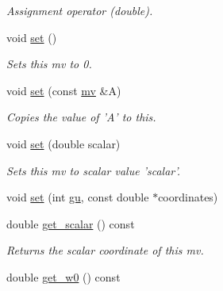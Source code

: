 \begin{DoxyCompactItemize}
\begin{DoxyCompactList}\small\item\em Assignment operator (double). \end{DoxyCompactList}\item 
\hypertarget{classe3ga_1_1mv_a9be643c5b7756c745b6edd8176e7c8e8}{void \hyperlink{classe3ga_1_1mv_a9be643c5b7756c745b6edd8176e7c8e8}{set} ()}\label{classe3ga_1_1mv_a9be643c5b7756c745b6edd8176e7c8e8}

\begin{DoxyCompactList}\small\item\em Sets this mv to 0. \end{DoxyCompactList}\item 
\hypertarget{classe3ga_1_1mv_ab75cf6f261ecdaa82b5be824da877428}{void \hyperlink{classe3ga_1_1mv_ab75cf6f261ecdaa82b5be824da877428}{set} (const \hyperlink{classe3ga_1_1mv}{mv} \&A)}\label{classe3ga_1_1mv_ab75cf6f261ecdaa82b5be824da877428}

\begin{DoxyCompactList}\small\item\em Copies the value of 'A' to this. \end{DoxyCompactList}\item 
\hypertarget{classe3ga_1_1mv_acecd456305cc571c8df569d70ee54332}{void \hyperlink{classe3ga_1_1mv_acecd456305cc571c8df569d70ee54332}{set} (double scalar)}\label{classe3ga_1_1mv_acecd456305cc571c8df569d70ee54332}

\begin{DoxyCompactList}\small\item\em Sets this mv to scalar value 'scalar'. \end{DoxyCompactList}\item 
void \hyperlink{classe3ga_1_1mv_a202302a36047c4a160ab5cec0dddb2b4}{set} (int \hyperlink{classe3ga_1_1mv_a66b360fa8609ea9243f1c92b33d8e102}{gu}, const double $\ast$coordinates)
\item 
\hypertarget{classe3ga_1_1mv_a2a36c4ba9c4586b192d7a7faf0282c6b}{double \hyperlink{classe3ga_1_1mv_a2a36c4ba9c4586b192d7a7faf0282c6b}{get\-\_\-scalar} () const }\label{classe3ga_1_1mv_a2a36c4ba9c4586b192d7a7faf0282c6b}

\begin{DoxyCompactList}\small\item\em Returns the scalar coordinate of this mv. \end{DoxyCompactList}\item 
\hypertarget{classe3ga_1_1mv_a9afb90be6393aacba06d8e96d19bc4bc}{double \hyperlink{classe3ga_1_1mv_a9afb90be6393aacba06d8e96d19bc4bc}{get\-\_\-w0} () const }\label{classe3ga_1_1mv_a9afb90be6393aacba06d8e96d19bc4bc}


\end{DoxyCompactItemize}
